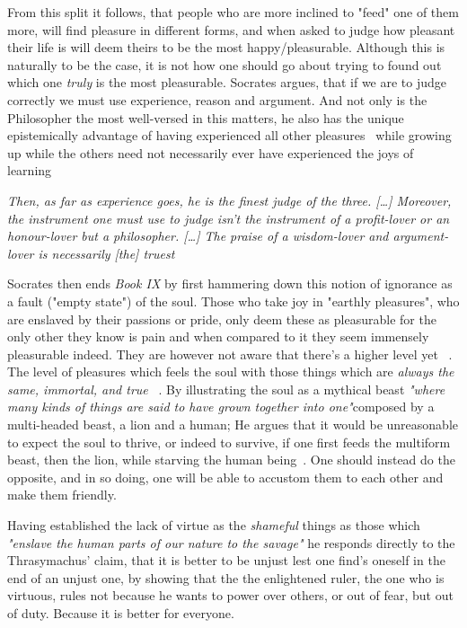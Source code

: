 \documentclass[english,course]{Notes}
\newcommand{\ita}[1]{\textit{#1}}
\newcommand\quo[1]{\begin{displayquote}\ita{\large{#1}}\end{displayquote}}
\begin{document}
\par{From this split it follows, that people who are more inclined to "feed" one of them more, will find pleasure in different forms, and when asked to judge how pleasant their life is will deem theirs to be the most happy/pleasurable. Although this is naturally to be the case, it is not how one should go about trying to found out which one \ita{truly} is the most pleasurable. Socrates argues, that if we are to judge correctly we must use experience, reason and argument. And not only is the Philosopher the most well-versed in this matters, he also has the unique epistemically advantage of having experienced all other pleasures~ while growing up while the others need not necessarily ever have experienced the joys of learning}

\quo{Then, as far as experience goes, he is the finest judge of the three. [\dots] Moreover, the instrument one must use to judge isn't the instrument of a profit-lover or an honour-lover but a philosopher. [\dots] The praise of a wisdom-lover and argument-lover is necessarily [the] truest}

\par{Socrates then ends \ita{Book IX} by first hammering down this notion of ignorance as a fault ("empty state") of the soul. Those who take joy in "earthly pleasures", who are enslaved by their passions or pride, only deem these as pleasurable for the only other they know is pain and when compared to it they seem immensely pleasurable indeed. They are however not aware that there's a higher level yet~ . The level of pleasures which feels the soul with those things which are \ita{always the same, immortal, and true} ~. By illustrating the soul as a mythical beast \ita{"where many kinds of things are said to have grown together into one"}composed by a multi-headed beast, a lion and a human; He argues that it would be unreasonable to expect the soul to thrive, or indeed to survive, if one first feeds the multiform beast, then the lion, while starving the human being~. One should instead do the opposite, and in so doing, one will be able to accustom them to each other and make them friendly.}

\par{Having established the lack of virtue as the \ita{shameful} things as those which \ita{"enslave the human parts of our nature to the savage"} he responds directly to the Thrasymachus' claim, that it is better to be unjust lest one find's oneself in the end of an unjust one, by showing that the the enlightened ruler, the one who is virtuous, rules not because he wants to power over others, or out of fear, but out of duty. Because it is better for everyone.}
\end{document}
